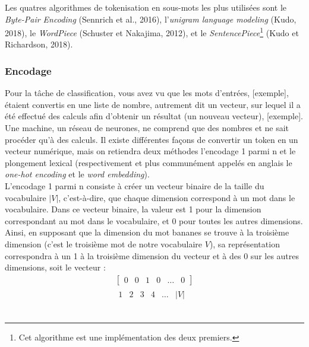 \documentclass[12pt, french, twoside]{report}
\begin{document}
\indent Les quatres algorithmes de tokenisation en sous-mots les plus utilisées sont le \textit{Byte-Pair Encoding} (Sennrich et al., 2016), l'\textit{unigram language modeling} (Kudo, 2018), le \textit{WordPiece} (Schuster et Nakajima, 2012), et le \textit{SentencePiece}\footnote{Cet algorithme est une implémentation des deux premiers.} (Kudo et Richardson, 2018).\cite{jurafsky_regular}\\

\subsubsection{Encodage}
Pour la tâche de classification, vous avez vu que les mots d'entrées, [exemple], étaient convertis en une liste de nombre, autrement dit un vecteur, sur lequel il a été effectué des calculs afin d'obtenir un résultat (un nouveau vecteur), [exemple]. Une machine, un réseau de neurones, ne comprend que des nombres et ne sait procéder qu'à des calculs. Il existe différentes façons de convertir un token en un vecteur numérique, mais on retiendra deux méthodes l'encodage 1 parmi n et le plongement lexical (respectivement et plus communément appelés en anglais le \textit{one-hot encoding} et le \textit{word embedding}).\\

L'encodage 1 parmi n consiste à créer un vecteur binaire de la taille du vocabulaire $|V|$, c'est-à-dire, que chaque dimension correspond à un mot dans le vocabulaire. Dans ce vecteur binaire, la valeur est 1 pour la dimension correspondant au mot dans le vocabulaire, et 0 pour toutes les autres dimensions. Ainsi, en supposant que la dimension du mot \og bananes\fg{} se trouve à la troisième dimension (c'est le troisième mot de notre vocabulaire $V$), sa représentation correspondra à un 1 à la troisième dimension du vecteur et à des 0 sur les autres dimensions, soit le vecteur :
\begin{align*}
    \begin{bmatrix}
    0 & 0 & 1 & 0 & \dots & 0
    \end{bmatrix}\\
    \begin{matrix}
    1 & 2 & 3 & 4 & \dots & |V|
    \end{matrix}
\end{align*}
\hfill \cite[(Chap 7, Jurasky)]{jurafsky_ffnn}\\
\end{document}
